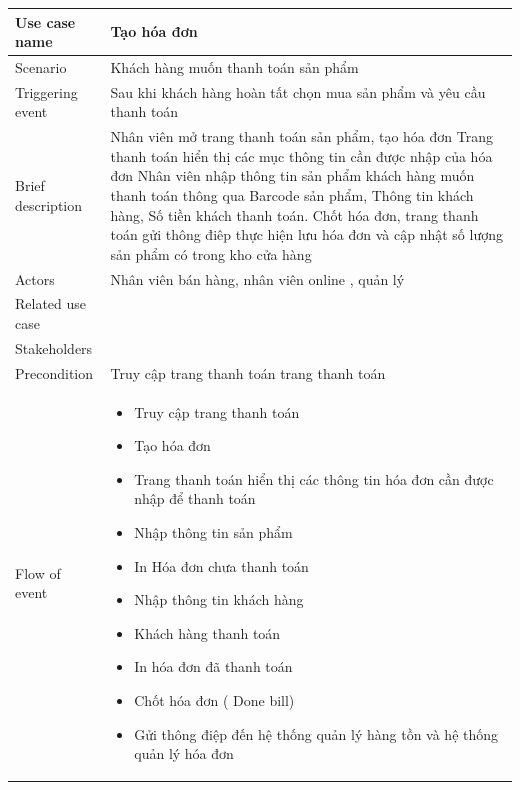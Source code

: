 \documentclass{article}
\begin{document}
\begin{tabular}{|m{4cm}|m{12cm}|}
		\hline
		Use case name & Tạo hóa đơn\\
		\hline
		Scenario & Khách hàng muốn thanh toán sản phẩm\\
		\hline
		Triggering event & Sau khi khách hàng hoàn tất chọn mua sản phẩm và yêu cầu thanh toán\\
		\hline
		Brief description & Nhân viên mở trang thanh toán sản phẩm, tạo hóa đơn
Trang thanh toán hiển thị các mục thông tin cần được nhập của hóa đơn
Nhân viên nhập thông tin sản phẩm khách hàng muốn thanh toán thông qua Barcode sản phẩm, Thông tin khách hàng, Số tiền khách thanh toán.
Chốt hóa đơn, trang thanh toán gửi thông điêp thực hiện lưu hóa đơn và cập nhật số lượng sản phẩm có trong kho cửa hàng\\

		\hline
		 Actors & Nhân viên bán hàng, nhân viên online , quản lý\\
		 \hline
		 Related use case& \\
		 \hline
		 Stakeholders & \\
		 \hline
		 Precondition & Truy cập trang thanh toán trang thanh toán\\
		 \hline
		 Flow of event & 
		 	\begin{itemize}
		 		\item	Truy cập trang thanh toán
		 		\item 	Tạo hóa đơn
		 		\item	Trang thanh toán hiển thị các thông tin hóa đơn cần được nhập để thanh toán
		 		\item	Nhập thông tin sản phẩm
				\item In Hóa đơn chưa thanh toán
				\item	Nhập thông tin khách hàng
				\item	Khách hàng thanh toán
				\item	In hóa đơn đã thanh toán
				\item	Chốt hóa đơn ( Done bill)
				\item Gửi thông điệp đến hệ thống quản lý hàng tồn và hệ thống quản lý hóa đơn

		 	\end{itemize} \\
		 	\hline
		 	\end{tabular}
		 	
\end{document}
